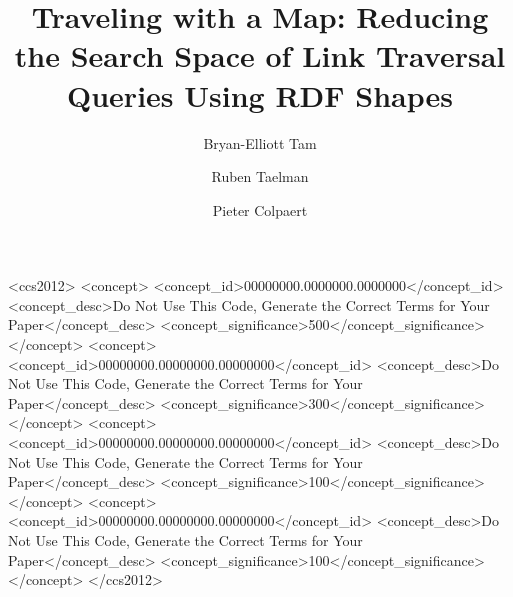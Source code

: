 \documentclass[sigconf,natbib=false]{acmart}
\begin{document}
\title{Traveling with a Map: Reducing the Search Space of Link Traversal Queries Using RDF Shapes}

\author{Bryan-Elliott Tam}

\author{Ruben Taelman}

\author{Pieter Colpaert}



\renewcommand{\shortauthors}{B.-E. Tam et al.}



\iffalse
\begin{CCSXML}
<ccs2012>
 <concept>
  <concept_id>00000000.0000000.0000000</concept_id>
  <concept_desc>Do Not Use This Code, Generate the Correct Terms for Your Paper</concept_desc>
  <concept_significance>500</concept_significance>
 </concept>
 <concept>
  <concept_id>00000000.00000000.00000000</concept_id>
  <concept_desc>Do Not Use This Code, Generate the Correct Terms for Your Paper</concept_desc>
  <concept_significance>300</concept_significance>
 </concept>
 <concept>
  <concept_id>00000000.00000000.00000000</concept_id>
  <concept_desc>Do Not Use This Code, Generate the Correct Terms for Your Paper</concept_desc>
  <concept_significance>100</concept_significance>
 </concept>
 <concept>
  <concept_id>00000000.00000000.00000000</concept_id>
  <concept_desc>Do Not Use This Code, Generate the Correct Terms for Your Paper</concept_desc>
  <concept_significance>100</concept_significance>
 </concept>
</ccs2012>
\end{CCSXML}
\end{document}
